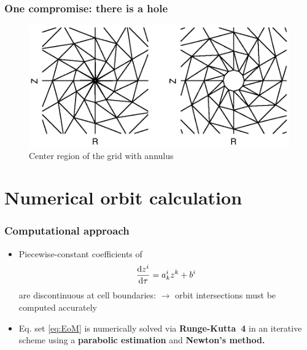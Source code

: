 \documentclass{beamer}
\newcommand{\be}[1]{\begin{equation} \label{#1}}
\newcommand{\ee}{\end{equation}}
\newcommand{\rd}{{\rm d}}
\begin{document}
\begin{frame}
\frametitle{One compromise: there is a hole}
\vspace{-1.2cm}
		\begin{center}
			\begin{figure}
				\includegraphics[trim={1cm 2cm 1cm 2cm},clip,width=1\textwidth]{FIGURES/Comparison_smin_annulus.eps}
				\caption{Center region of the grid with annulus}
			\end{figure}
		\end{center}
\end{frame}









\section{Numerical orbit calculation}


\begin{frame}
\frametitle{Computational approach}
\vspace{-0.75cm}
\begin{itemize}
	\item Piecewise-constant coefficients of 
	\setcounter{equation}{2}
	\be{eq:EoM}
	\frac{\rd z^i}{\rd \tau} = a^i_k z^k + b^i
	\ee
	are discontinuous at cell boundaries: \newline$\rightarrow$ orbit intersections must be computed accurately
	\vspace{0.3cm}
	\item Eq. set \eqref{eq:EoM} is numerically solved via \textbf{Runge-Kutta~4} in an iterative scheme using a \textbf{parabolic estimation} and \textbf{Newton's method.}

\end{itemize}
\end{frame}
\end{document}
